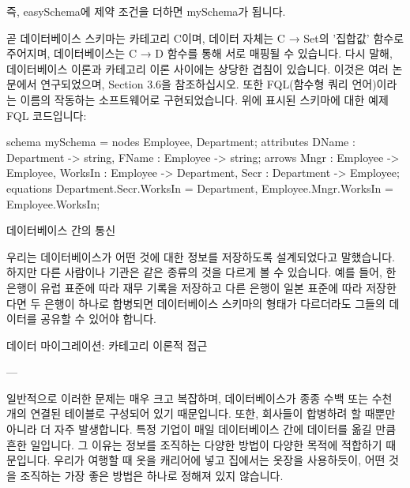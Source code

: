 \documentclass[11pt, a4paper, twoside, openany]{book}
\begin{document}
{\par\medskip
즉, easySchema\hspace{0pt}에 제약 조건을 더하면 mySchema\hspace{0pt}가 됩니다.

\par\medskip
곧 데이터베이스 스키마는 카테고리 C\hspace{0pt}이며, 데이터 자체는 C → Set\hspace{0pt}의 '집합값' 함수로 주어지며, 데이터베이스는 C → D 함수를 통해 서로 매핑될 수 있습니다. 다시 말해, 데이터베이스 이론과 카테고리 이론 사이에는 상당한 겹침이 있습니다. 이것은 여러 논문에서 연구되었으며, Section 3.6\hspace{0pt}을 참조하십시오. 또한 FQL(함수형 쿼리 언어)이라는 이름의 작동하는 소프트웨어로 구현되었습니다. 위에 표시된 스키마에 대한 예제 FQL 코드입니다:

\par\medskip
schema mySchema = {
nodes
Employee, Department;
attributes
DName : Department -> string,
FName : Employee
-> string;
arrows
Mngr
: Employee
-> Employee,
WorksIn : Employee
-> Department,
Secr
: Department -> Employee;
equations
Department.Secr.WorksIn = Department,
Employee.Mngr.WorksIn
= Employee.WorksIn;
}

\par\medskip
데이터베이스 간의 통신

\par\medskip
우리는 데이터베이스가 어떤 것에 대한 정보를 저장하도록 설계되었다고 말했습니다. 하지만 다른 사람이나 기관은 같은 종류의 것을 다르게 볼 수 있습니다. 예를 들어, 한 은행이 유럽 표준에 따라 재무 기록을 저장하고 다른 은행이 일본 표준에 따라 저장한다면 두 은행이 하나로 합병되면 데이터베이스 스키마의 형태가 다르더라도 그들의 데이터를 공유할 수 있어야 합니다.

\par\medskip
데이터 마이그레이션: 카테고리 이론적 접근

\par\medskip
---

\par\medskip
일반적으로 이러한 문제는 매우 크고 복잡하며, 데이터베이스가 종종 수백 또는 수천 개의 연결된 테이블로 구성되어 있기 때문입니다. 또한, 회사들이 합병하려 할 때뿐만 아니라 더 자주 발생합니다. 특정 기업이 매일 데이터베이스 간에 데이터를 옮길 만큼 흔한 일입니다. 그 이유는 정보를 조직하는 다양한 방법이 다양한 목적에 적합하기 때문입니다. 우리가 여행할 때 옷을 캐리어에 넣고 집에서는 옷장을 사용하듯이, 어떤 것을 조직하는 가장 좋은 방법은 하나로 정해져 있지 않습니다.

}
\end{document}
